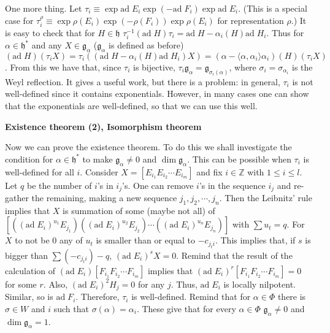 \documentclass{article}
\newcommand{\InZ}{\mathbb{Z}}
\newcommand{\lie}[1]{\mathfrak{#1}}
\newcommand{\ad}[1]{\mathrm{ad}\; #1}
\begin{document}
One more thing.
Let $\tau_i \equiv \exp{\ad{E_i}} \exp{(-\ad{F_i})} \exp{\ad{E_i}}$.
(This is a special case for $\tau^\rho_i \equiv \exp{\rho(E_i)} \exp{(-\rho(F_i))} \exp{\rho(E_i)}$ for representation $\rho$.)
It is easy to check that for $H \in \lie{h}$ $\tau_i^{-1} (\ad{H}) \tau_i = \ad{H} - \alpha_i(H) \ad{H_i}$.
Thus for $\alpha \in \lie{h}^*$ and any $X \in \lie{g}_\alpha$ ($\lie{g}_\alpha$ is defined as before) $(\ad{H})(\tau_i X) = \tau_i((\ad{H} - \alpha_i(H) \ad{H_i})X) = (\alpha - \langle \alpha, \alpha_i \rangle \alpha_i)(H) (\tau_i X)$.
From this we have that, since $\tau_i$ is bijective, $\tau_i \lie{g}_\alpha = \lie{g}_{\sigma_i(\alpha)}$, where $\sigma_i = \sigma_{\alpha_i}$ is the Weyl reflection.
It gives a useful work, but there is a problem: in general, $\tau_i$ is not well-defined since it contains exponentials.
However, in many cases one can show that the exponentials are well-defined, so that we can use this well.

\newpage

\textbf{Existence theorem (2), Isomorphism theorem}

Now we can prove the existence theorem.
To do this we shall investigate the condition for $\alpha \in \lie{h}^*$ to make $\lie{g}_\alpha \ne 0$ and $\dim{\lie{g}_\alpha}$.
This can be possible when $\tau_i$ is well-defined for all $i$.
Consider $X = [E_{i_1} E_{i_2} \cdots E_{i_m}]$ and fix $i \in \InZ$ with $1 \le i \le l$.
Let $q$ be the number of $i$'s in $i_j$'s.
One can remove $i$'s in the sequence $i_j$ and re-gather the remaining, making a new sequence $j_1, j_2, \cdots, j_n$.
Then the Leibnitz' rule implies that $X$ is summation of some (maybe not all) of $[((\ad{E_i})^{u_1} E_{j_1}) ((\ad{E_i})^{u_2} E_{j_2}) \cdots ((\ad{E_i})^{u_n} E_{j_n})]$ with $\sum u_t = q$.
For $X$ to not be 0 any of $u_t$ is smaller than or equal to $-c_{j_t i}$.
This implies that, if $s$ is bigger than $\sum (-c_{j_t i}) - q$, $(\ad{E_i})^s X = 0$.
Remind that the result of the calculation of $(\ad{E_i})[F_{i_1} F_{i_2} \cdots F_{i_m}]$ implies that $(\ad{E_i})^r [F_{i_1} F_{i_2} \cdots F_{i_m}] = 0$ for some $r$.
Also, $(\ad{E_i})^2 H_j = 0$ for any $j$.
Thus, $\ad{E_i}$ is locally nilpotent.
Similar, so is $\ad{F_i}$.
Therefore, $\tau_i$ is well-defined.
Remind that for $\alpha \in \Phi$ there is $\sigma \in W$ and $i$ such that $\sigma(\alpha) = \alpha_i$.
These give that for every $\alpha \in \Phi$ $\lie{g}_\alpha \ne 0$ and $\dim{\lie{g}_\alpha} = 1$.
\end{document}
